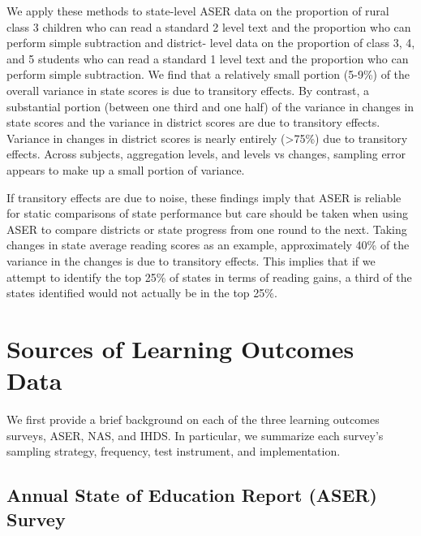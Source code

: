 \documentclass[
  11pt,
]{article}
\begin{document}
We apply these methods to state-level ASER data on the proportion of rural class 3 children who can read a standard 2 level text and the proportion who can perform simple subtraction and district- level data on the proportion of class 3, 4, and 5 students who can read a standard 1 level text and the proportion who can perform simple subtraction. We find that a relatively small portion (5-9\%) of the overall variance in state scores is due to transitory effects. By contrast, a substantial portion (between one third and one half) of the variance in changes in state scores and the variance in district scores are due to transitory effects. Variance in changes in district scores is nearly entirely (\textgreater75\%) due to transitory effects. Across subjects, aggregation levels, and levels vs changes, sampling error appears to make up a small portion of variance.

If transitory effects are due to noise, these findings imply that ASER is reliable for static comparisons of state performance but care should be taken when using ASER to compare districts or state progress from one round to the next. Taking changes in state average reading scores as an example, approximately 40\% of the variance in the changes is due to transitory effects. This implies that if we attempt to identify the top 25\% of states in terms of reading gains, a third of the states identified would not actually be in the top 25\%.

\hypertarget{sources-of-learning-outcomes-data}{%
\section{Sources of Learning Outcomes Data}\label{sources-of-learning-outcomes-data}}

We first provide a brief background on each of the three learning outcomes surveys, ASER, NAS, and IHDS. In particular, we summarize each survey's sampling strategy, frequency, test instrument, and implementation.

\hypertarget{annual-state-of-education-report-aser-survey}{%
\subsection{Annual State of Education Report (ASER) Survey}\label{annual-state-of-education-report-aser-survey}}
\end{document}
